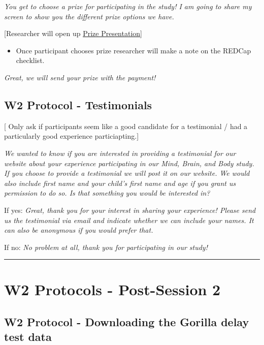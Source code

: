 \documentclass[]{book}
\providecommand{\tightlist}{%
  \setlength{\itemsep}{0pt}\setlength{\parskip}{0pt}}
\begin{document}
\emph{You get to choose a prize for participating in the study! I am going to share my screen to show you the different prize options we have.}

{[}Researcher will open up \href{https://app.box.com/file/780536035674}{Prize Presentation}{]}

\begin{itemize}
\tightlist
\item
  Once participant chooses prize researcher will make a note on the REDCap checklist.
\end{itemize}

\emph{Great, we will send your prize with the payment!}

\hypertarget{w2-protocol---testimonials}{%
\subsection{W2 Protocol - Testimonials}\label{w2-protocol---testimonials}}

{[} Only ask if participants seem like a good candidate for a testimonial / had a particularly good experience particiapting.{]}

\emph{We wanted to know if you are interested in providing a testimonial for our website about your experience participating in our Mind, Brain, and Body study. If you choose to provide a testimonial we will post it on our website. We would also include first name and your child's first name and age if you grant us permission to do so. Is that something you would be interested in?}

If yes: \emph{Great, thank you for your interest in sharing your experience! Please send us the testimonial via email and indicate whether we can include your names. It can also be anonymous if you would prefer that.}

If no: \emph{No problem at all, thank you for participating in our study!}

\begin{center}\rule{0.5\linewidth}{0.5pt}\end{center}

\hypertarget{w2-protocols---post-session-2}{%
\section{W2 Protocols - Post-Session 2}\label{w2-protocols---post-session-2}}

\hypertarget{w2-protocol---downloading-the-gorilla-delay-test-data}{%
\subsection{W2 Protocol - Downloading the Gorilla delay test data}\label{w2-protocol---downloading-the-gorilla-delay-test-data}}
\end{document}
